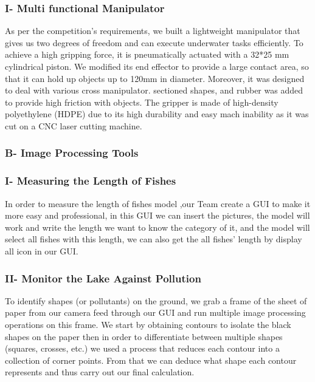 \documentclass[a4paper,12pt,leqno]{report}
\begin{document}
\textcolor{orange!90}{
	\subsubsection{I- Multi functional Manipulator }}	
As per the competition’s requirements, we built a lightweight  manipulator that gives us two degrees of freedom and can execute  underwater tasks efficiently. 
To achieve a high gripping force, it is pneumatically actuated with a  32*25 mm cylindrical piston. We modified its end effector to provide a  large contact area, so that it can hold up objects up to 120mm in  diameter. Moreover, it was designed to deal with various cross manipulator.    sectioned shapes, and rubber was added to provide high friction with objects. The gripper is made of high-density polyethylene (HDPE) due to its high durability and easy mach inability as  it was cut on a CNC laser cutting machine.\\ 
\textcolor{blue!40}{
\subsubsection{B- Image Processing Tools}}	
\textcolor{orange!90}{
\subsubsection{I- Measuring the Length of Fishes}}
In order to measure the length of fishes model ,our Team create a GUI to make it more easy and professional, in this GUI we can insert the pictures, the model will work and write the length we want to know the category of it, and the model will select all fishes with this length, we can also get the all fishes’ length by display all icon in our GUI. \\
\textcolor{orange!90}{
\subsubsection{II- Monitor the Lake Against Pollution }}	
To identify shapes (or pollutants) on the ground, we grab a frame of the sheet of paper from our camera feed through our GUI and run multiple image processing operations on this frame. We start by obtaining contours to isolate the black shapes on the paper then in order to differentiate between multiple shapes (squares, crosses, etc.) we used a process that reduces each contour  into a collection of corner points. From that we can deduce what shape each contour represents and thus carry out our final calculation.\\ 
\end{document}
